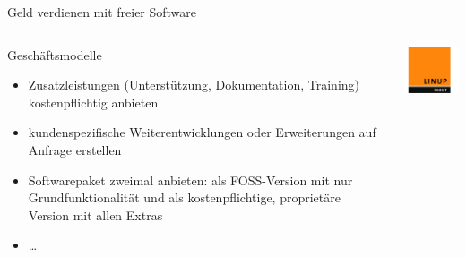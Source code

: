 \documentclass[aspectratio=43]{beamer}
\begin{document}
\begin{frame}{Geld verdienen mit freier Software}
  \begin{columns}
    \begin{column}{0.7\textwidth}
      \begin{block}{Geschäftsmodelle}
        \begin{itemize}
          \item Zusatzleistungen (Unterstützung, Dokumentation, Training) kostenpflichtig anbieten
          \item kundenspezifische Weiterentwicklungen oder Erweiterungen auf Anfrage erstellen
          \item Softwarepaket zweimal anbieten: als FOSS-Version mit nur Grundfunktionalität und als 
              kostenpflichtige, proprietäre Version mit allen Extras
          \item \dots
        \end{itemize}
      \end{block}
    \end{column}
    \begin{column}{0.2\textwidth}
      \includegraphics[width=\textwidth]{pix/linup_front}\\
    \end{column}
  \end{columns}
\end{frame}
\end{document}
